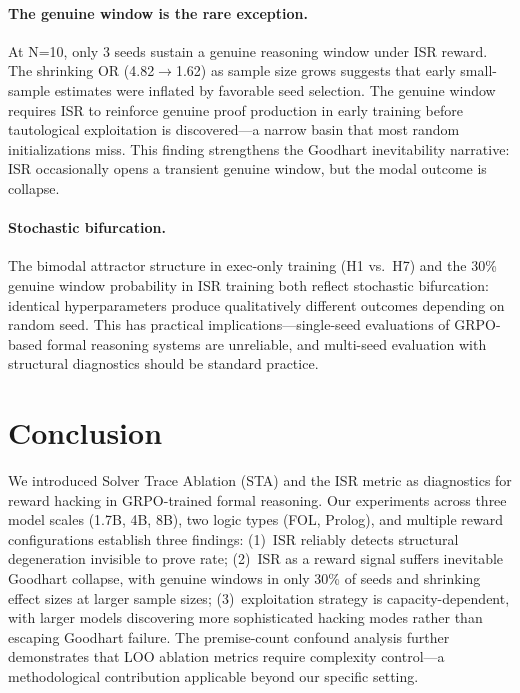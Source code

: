 \documentclass[11pt]{article}
\begin{document}
\paragraph{The genuine window is the rare exception.} At N=10, only 3 seeds sustain a genuine reasoning window under ISR reward. The shrinking OR (4.82$\to$1.62) as sample size grows suggests that early small-sample estimates were inflated by favorable seed selection. The genuine window requires ISR to reinforce genuine proof production in early training before tautological exploitation is discovered---a narrow basin that most random initializations miss. This finding strengthens the Goodhart inevitability narrative: ISR occasionally opens a transient genuine window, but the modal outcome is collapse.

\paragraph{Stochastic bifurcation.} The bimodal attractor structure in exec-only training (H1 vs.\ H7) and the 30\% genuine window probability in ISR training both reflect stochastic bifurcation: identical hyperparameters produce qualitatively different outcomes depending on random seed. This has practical implications---single-seed evaluations of GRPO-based formal reasoning systems are unreliable, and multi-seed evaluation with structural diagnostics should be standard practice.

\section{Conclusion}

We introduced Solver Trace Ablation (STA) and the ISR metric as diagnostics for reward hacking in GRPO-trained formal reasoning. Our experiments across three model scales (1.7B, 4B, 8B), two logic types (FOL, Prolog), and multiple reward configurations establish three findings: (1)~ISR reliably detects structural degeneration invisible to prove rate; (2)~ISR as a reward signal suffers inevitable Goodhart collapse, with genuine windows in only 30\% of seeds and shrinking effect sizes at larger sample sizes; (3)~exploitation strategy is capacity-dependent, with larger models discovering more sophisticated hacking modes rather than escaping Goodhart failure. The premise-count confound analysis further demonstrates that LOO ablation metrics require complexity control---a methodological contribution applicable beyond our specific setting.
\end{document}
